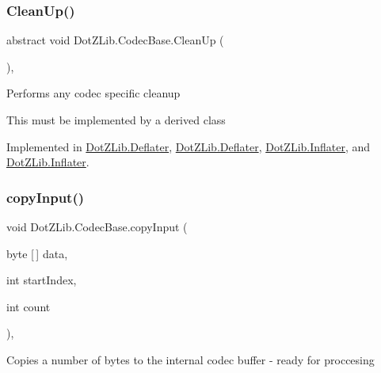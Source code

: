 \subsubsection{\texorpdfstring{Clean\+Up()}{CleanUp()}\hspace{0.1cm}{\footnotesize\ttfamily [2/2]}}
{\footnotesize\ttfamily abstract void Dot\+Z\+Lib.\+Codec\+Base.\+Clean\+Up (\begin{DoxyParamCaption}{ }\end{DoxyParamCaption})\hspace{0.3cm}{\ttfamily [protected]}, {}}



Performs any codec specific cleanup 

This must be implemented by a derived class

Implemented in \hyperlink{class_dot_z_lib_1_1_deflater_af06ac29d92dbe5d6198b8fa906476e05}{Dot\+Z\+Lib.\+Deflater}, \hyperlink{class_dot_z_lib_1_1_deflater_af06ac29d92dbe5d6198b8fa906476e05}{Dot\+Z\+Lib.\+Deflater}, \hyperlink{class_dot_z_lib_1_1_inflater_af4ed4f530151f83222d2cb732a77626b}{Dot\+Z\+Lib.\+Inflater}, and \hyperlink{class_dot_z_lib_1_1_inflater_af4ed4f530151f83222d2cb732a77626b}{Dot\+Z\+Lib.\+Inflater}.

\mbox{\label{class_dot_z_lib_1_1_codec_base_a8c827f091195356490e7f8b69e0546a7}} 
\subsubsection{\texorpdfstring{copy\+Input()}{copyInput()}\hspace{0.1cm}{\footnotesize\ttfamily [1/2]}}
{\footnotesize\ttfamily void Dot\+Z\+Lib.\+Codec\+Base.\+copy\+Input (\begin{DoxyParamCaption}\item[{byte \mbox{[}$\,$\mbox{]}}]{data,  }\item[{int}]{start\+Index,  }\item[{int}]{count }\end{DoxyParamCaption})\hspace{0.3cm}{\ttfamily [inline]}, {\ttfamily [protected]}}



Copies a number of bytes to the internal codec buffer -\/ ready for proccesing 


